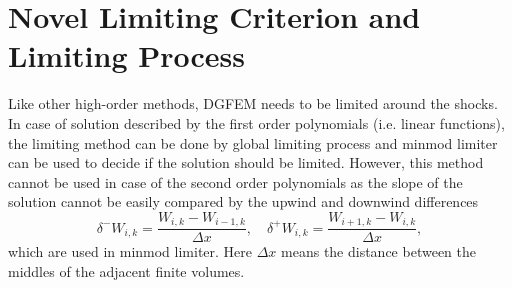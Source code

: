 \section{Novel Limiting Criterion and Limiting Process}\label{limSec}

Like other high-order methods, DGFEM needs to be limited around the shocks. In case of solution described by the first order polynomials (i.e. linear functions), the limiting method can be done by global limiting process and minmod limiter can be used to decide if the solution should be limited. However, this method cannot be used in case of the second order polynomials as the slope of the solution cannot be easily compared by the upwind and downwind differences 
\begin{equation}\label{diff}
\delta^- W_{i,k}=\frac{W_{i,k}-W_{i-1,k}}{\Delta x},\quad \delta^+W_{i,k}=\frac{W_{i+1,k}-W_{i,k}}{\Delta x},
\end{equation}
which are used in minmod limiter. Here $\Delta x$ means the distance between the middles of the adjacent finite volumes. 

